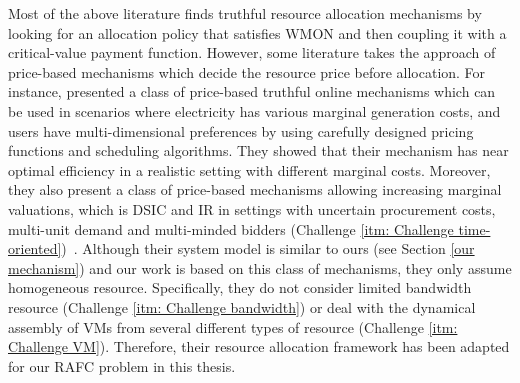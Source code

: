 \documentclass[11pt]{phdthesis}
\begin{document}
Most of the above literature finds truthful resource allocation mechanisms by looking for an allocation policy that satisfies WMON and then coupling it with a critical-value payment function. However, some literature takes the approach of price-based mechanisms which decide the resource price before allocation. For instance, \citet{hayakawa2015online} presented a class of price-based truthful online mechanisms which can be used in scenarios where electricity has various marginal generation costs, and users have multi-dimensional preferences by using carefully designed pricing functions and scheduling algorithms. They showed that their mechanism has near optimal efficiency in a realistic setting with different marginal costs. Moreover, they also present a class of price-based mechanisms allowing increasing marginal valuations, which is DSIC and IR in settings with uncertain procurement costs, multi-unit demand and multi-minded bidders (Challenge \ref{itm: Challenge time-oriented})~\citep{hayakawa2018price}. 
Although their system model is similar to ours (see Section \ref{our mechanism}) and our work is based on this class of mechanisms, they only assume homogeneous resource. Specifically, they do not consider limited bandwidth resource (Challenge \ref{itm: Challenge bandwidth}) or deal with the dynamical assembly of VMs from several different types of resource (Challenge \ref{itm: Challenge VM}). Therefore, their resource allocation framework has been adapted for our RAFC problem in this thesis.
\end{document}
